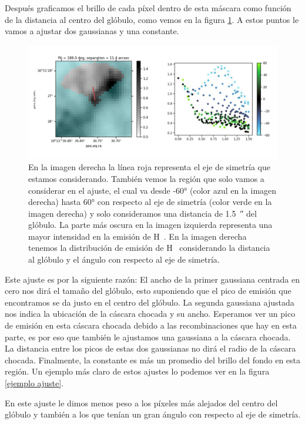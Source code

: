 \documentclass{book}
\begin{document}
Después graficamos el brillo de cada píxel dentro de esta máscara como función de la distancia al centro del glóbulo, como vemos en la figura \ref{ejemplo mascara}. A estos puntos le vamos a ajustar dos gaussianas y una constante.

\begin{figure}[htb]
    \centering
    \includegraphics[width=\textwidth]{images Chapter 3/C3_mask.jpg}
    \caption{En la imagen derecha la línea roja representa el eje de simetría que estamos considerando. También vemos la región que solo vamos a considerar en el ajuste, el cual va desde \ang{-60}  (color azul en la imagen derecha) hasta \ang{60} con respecto al eje de simetría (color verde en la imagen derecha) y solo consideramos una distancia de  \SI{1.5}{\arcsecond} del glóbulo. La parte más oscura en la imagen izquierda representa una mayor intensidad en la emisión de \unit{H\alpha}. En la imagen derecha tenemos la distribución de emisión de \unit{H\alpha} considerando la distancia al glóbulo y el ángulo con respecto al eje de simetría.}
    \label{ejemplo mascara}
\end{figure}

Este ajuste es por la siguiente razón: El ancho de la primer gaussiana centrada en cero nos dirá el tamaño del glóbulo, esto suponiendo que el pico de emisión que encontramos se da justo en el centro del glóbulo. La segunda gaussiana ajustada nos indica la ubicación de la cáscara chocada y su ancho. Esperamos ver un pico de emisión en esta cáscara chocada debido a las recombinaciones que hay en esta parte, es por eso que también le ajustamos una gaussiana a la cáscara chocada. La distancia entre los picos de estas dos gaussianas no dirá el radio de la cáscara chocada. Finalmente, la constante es más un promedio del brillo del fondo en esta región. Un ejemplo más claro de estos ajustes lo podemos ver en la figura \ref{ejemplo ajuste}.

En este ajuste le dimos menos peso a los píxeles más alejados del centro del glóbulo y también a los que tenían un gran ángulo con respecto al eje de simetría.
\end{document}
